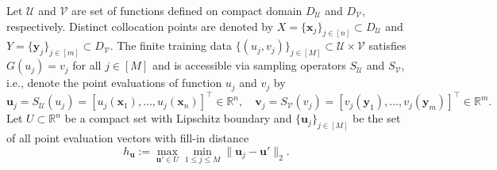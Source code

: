 \documentclass[11pt,twoside]{article}
\theoremstyle{plain}
\theoremstyle{definition}
\theoremstyle{remark}
\newcommand{\R}{\mathbb{R}}
\newcommand{\xb}{\mathbf{x}}
\newcommand{\yb}{\mathbf{y}}
\newcommand{\ub}{\mathbf{u}}
\newcommand{\vb}{\mathbf{v}}
\newcommand{\Uc}{\mathcal{U}}
\newcommand{\Vc}{\mathcal{V}}
\begin{document}
Let $\Uc$ and $\Vc$ are set of functions defined on compact domain $D_\Uc$ and $D_\Vc$, respectively. Distinct collocation points are denoted by $X=\{\xb_j\}_{j\in[n]}\subset D_\Uc$ and $Y=\{\yb_j\}_{j\in[m]}\subset D_\Vc$. The finite training data $\{ (u_j,v_j) \}_{j\in[M]} \subset \Uc \times \Vc$ satisfies $G(u_j) = v_j$ for all $j\in[M]$ and is accessible via sampling operators $S_\Uc$ and $S_\Vc$, i.e., denote the point evaluations of function $u_j$ and $v_j$ by
\begin{equation*}
\ub_j = S_\Uc(u_j) = [u_j(\xb_1), \dots, u_j(\xb_n)]^\top \in\R^n, \quad \vb_j = S_\Vc(v_j) = [v_j(\yb_1), \dots, v_j(\yb_m)]^\top \in\R^m.
\end{equation*}
Let $U\subset \R^n$ be a compact set with Lipschitz boundary and $\{ \ub_j\}_{j\in[M]}$ be the set of all point evaluation vectors with fill-in distance 
\begin{equation*}
h_\ub := \max_{\ub'\in U}\min_{1\leq j\leq M} \|\ub_j - \ub'\|_2.
\end{equation*}
\end{document}
